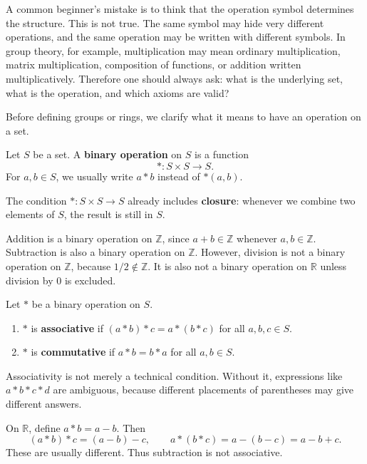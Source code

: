 A common beginner's mistake is to think that the operation symbol determines the structure. This is not true. The same symbol may hide very different operations, and the same operation may be written with different symbols. In group theory, for example, multiplication may mean ordinary multiplication, matrix multiplication, composition of functions, or addition written multiplicatively. Therefore one should always ask: what is the underlying set, what is the operation, and which axioms are valid?

Before defining groups or rings, we clarify what it means to have an operation on a set.

\begin{definition}
Let $S$ be a set. A \textbf{binary operation} on $S$ is a function
\[
    *:S\times S\to S.
\]
For $a,b\in S$, we usually write $a*b$ instead of $*(a,b)$.
\end{definition}

The condition $*:S\times S\to S$ already includes \textbf{closure}: whenever we combine two elements of $S$, the result is still in $S$.

\begin{example}
Addition is a binary operation on $\mathbb{Z}$, since $a+b\in\mathbb{Z}$ whenever $a,b\in\mathbb{Z}$. Subtraction is also a binary operation on $\mathbb{Z}$. However, division is not a binary operation on $\mathbb{Z}$, because $1/2\notin\mathbb{Z}$. It is also not a binary operation on $\mathbb{R}$ unless division by $0$ is excluded.
\end{example}

\begin{definition}
Let $*$ be a binary operation on $S$.
\begin{enumerate}
    \item $*$ is \textbf{associative} if $(a*b)*c=a*(b*c)$ for all $a,b,c\in S$.
    \item $*$ is \textbf{commutative} if $a*b=b*a$ for all $a,b\in S$.
\end{enumerate}
\end{definition}

Associativity is not merely a technical condition. Without it, expressions like $a*b*c*d$ are ambiguous, because different placements of parentheses may give different answers.

\begin{example}
On $\mathbb{R}$, define $a*b=a-b$. Then
\[
    (a*b)*c=(a-b)-c,
    \qquad
    a*(b*c)=a-(b-c)=a-b+c.
\]
These are usually different. Thus subtraction is not associative.
\end{example}

